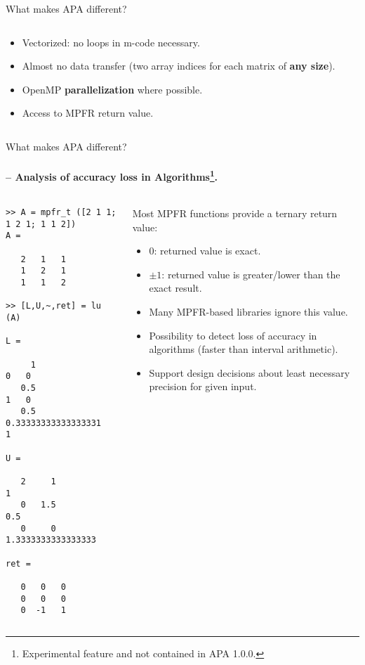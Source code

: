 \begin{frame}[fragile]{What makes APA different?}
\begin{columns}
\begin{column}{0.35\linewidth}
\begin{itemize}
\item
Vectorized: no loops in m-code necessary.

\item
Almost no data transfer
(two array indices for each matrix of \textbf{any size}).

\item
OpenMP \textbf{parallelization} where possible.

\item
Access to MPFR return value.
\end{itemize}
\end{column}
\end{columns}

\end{frame}


\begin{frame}[fragile]{What makes APA different?}
\framesubtitle{-- Analysis of accuracy loss in Algorithms\footnote{Experimental
feature and not contained in APA 1.0.0.}.}

\begin{columns}
\begin{column}{0.35\linewidth}
\begin{lstlisting}[basicstyle=\tiny]
>> A = mpfr_t ([2 1 1; 1 2 1; 1 1 2])
A =

   2   1   1
   1   2   1
   1   1   2

>> [L,U,~,ret] = lu (A)

L =

     1                     0   0
   0.5                     1   0
   0.5   0.33333333333333331   1

U =

   2     1                    1
   0   1.5                  0.5
   0     0   1.3333333333333333

ret =

   0   0   0
   0   0   0
   0  -1   1
\end{lstlisting}
\end{column}
\begin{column}{0.55\linewidth}
Most MPFR functions provide a ternary return value:
\begin{itemize}
\item $0$: returned value is exact.
\item $\pm 1$: returned value is greater/lower than the exact result.

\bigskip

\item
Many MPFR-based libraries ignore this value.

\item
Possibility to detect loss of accuracy in algorithms
(faster than interval arithmetic).

\item
Support design decisions about least necessary precision
for given input.
\end{itemize}
\end{column}
\end{columns}
\end{frame}